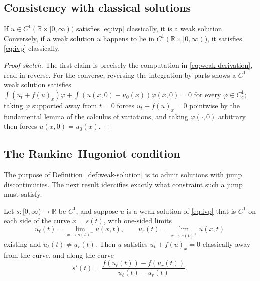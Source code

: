 \subsection{Consistency with classical solutions}
\label{subsec:weak-consistency}

\begin{proposition}[Consistency]
\label{prop:weak-consistency}
If $u \in C^1(\mathbb{R}\times[0,\infty))$ satisfies \eqref{eq:ivp}
classically, it is a weak solution. Conversely, if a weak solution $u$
happens to lie in $C^1(\mathbb{R}\times[0,\infty))$, it satisfies
\eqref{eq:ivp} classically.
\end{proposition}

\begin{proof}[Proof sketch]
The first claim is precisely the computation in
\eqref{eq:weak-derivation}, read in reverse. For the converse, reversing
the integration by parts shows a $C^1$ weak solution satisfies
$\int (u_t+f(u)_x)\varphi + \int (u(x,0)-u_0(x))\varphi(x,0) = 0$ for
every $\varphi\in C_c^1$; taking $\varphi$ supported away from $t=0$
forces $u_t+f(u)_x=0$ pointwise by the fundamental lemma of the calculus
of variations, and taking $\varphi(\cdot,0)$ arbitrary then forces
$u(x,0)=u_0(x)$.
\end{proof}

\subsection{The Rankine--Hugoniot condition}
\label{subsec:rankine-hugoniot}

The purpose of Definition~\ref{def:weak-solution} is to admit solutions
with jump discontinuities. The next result identifies exactly what
constraint such a jump must satisfy.

\begin{theorem}
\label{thm:rankine-hugoniot}
Let $s : [0,\infty) \to \mathbb{R}$ be $C^1$, and suppose $u$ is a weak
solution of \eqref{eq:ivp} that is $C^1$ on each side of the curve
$x=s(t)$, with one-sided limits
\begin{equation}
  u_\ell(t) = \lim_{x \to s(t)^-} u(x,t), \qquad u_r(t) = \lim_{x \to s(t)^+} u(x,t)
\end{equation}
existing and $u_\ell(t) \neq u_r(t)$. Then $u$ satisfies $u_t+f(u)_x=0$
classically away from the curve, and along the curve
\begin{equation}
  \label{eq:rankine-hugoniot}
  s'(t) = \frac{f(u_\ell(t)) - f(u_r(t))}{u_\ell(t) - u_r(t)}.
\end{equation}
\end{theorem}

